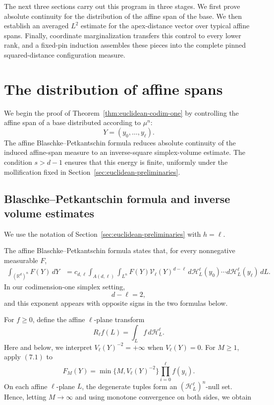 \documentclass[11pt]{article}
\theoremstyle{remark}
\newcommand{\R}{\mathbb R}
\newcommand{\cH}{\mathcal H}
\numberwithin{equation}{section}
\newcommand{\1}{\mathbf 1}
\begin{document}
The next three sections carry out this program in three stages.  We
first prove absolute continuity for the distribution of the affine span
of the base.  We then establish an averaged \(L^2\) estimate for the
apex-distance vector over typical affine spans.  Finally, coordinate
marginalization transfers this control to every lower rank, and a
fixed-pin induction assembles these pieces into the complete pinned
squared-distance configuration measure.


\section{The distribution of affine spans}
\label{sec:hulls}

We begin the proof of Theorem~\ref{thm:euclidean-codim-one} by
controlling the affine span of a base distributed according to \(\mu^n\):
\[
Y=(y_0,\ldots,y_\ell).
\]
The affine Blaschke--Petkantschin formula reduces absolute continuity of
the induced affine-span measure to an inverse-square simplex-volume
estimate. The condition \(s>d-1\) ensures that this energy is finite,
uniformly under the mollification fixed in
Section~\ref{sec:euclidean-preliminaries}.

\subsection{Blaschke--Petkantschin formula and inverse volume estimates}

We use the notation of Section~\ref{sec:euclidean-preliminaries} with
\(h=\ell\).

The affine Blaschke--Petkantschin formula
\cite[Chapter~7]{SchneiderWeil} states that, for every nonnegative
measurable \(F\),
\begin{align}
\int_{(\R^d)^n}F(Y)\,dY
&=
c_{d,\ell}
\int_{A(d,\ell)}
\int_{L^n}
F(Y)\mathcal V_\ell(Y)^{d-\ell}\,
d\cH_L^\ell(y_0)\cdots d\cH_L^\ell(y_\ell)\,dL.
\label{eq:BP}
\end{align}
In our codimension-one simplex setting,
\[
d-\ell=2,
\]
and this exponent appears with opposite signs in the two formulas below.

For \(f\geq0\), define the affine \(\ell\)-plane transform
\[
R_\ell f(L)=\int_L f\,d\cH_L^\ell.
\]
Here and below, we interpret \(V_\ell(Y)^{-2}=+\infty\) when
\(V_\ell(Y)=0\). For \(M\geq 1\), apply \((7.1)\) to
\[
F_M(Y)
=
\min\{M,V_\ell(Y)^{-2}\}
\prod_{i=0}^{\ell} f(y_i).
\]
On each affine \(\ell\)-plane \(L\), the degenerate tuples form an
\((\cH^\ell_L)^n\)-null set. Hence, letting \(M\to\infty\) and using
monotone convergence on both sides, we obtain
\end{document}
